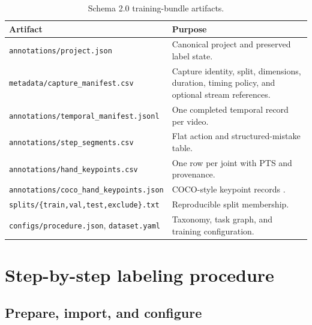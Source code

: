 \documentclass[10pt]{article}
\newcommand{\code}[1]{\texttt{\small #1}}
\begin{document}
\begin{table}[H]
\centering
\caption{Schema 2.0 training-bundle artifacts.}
\small
\begin{tabularx}{\textwidth}{@{}p{}Y@{}}
\toprule
\textbf{Artifact} & \textbf{Purpose}\\
\midrule
\code{annotations/project.json} & Canonical project and preserved label state.\\
\code{metadata/capture\_manifest.csv} & Capture identity, split, dimensions,
duration, timing policy, and optional stream references.\\
\code{annotations/temporal\_manifest.jsonl} & One completed temporal record per video.\\
\code{annotations/step\_segments.csv} & Flat action and structured-mistake table.\\
\code{annotations/hand\_keypoints.csv} & One row per joint with PTS and provenance.\\
\code{annotations/coco\_hand\_keypoints.json} & COCO-style keypoint records
\cite{lin2014coco}.\\
\code{splits/\{train,val,test,exclude\}.txt} & Reproducible split membership.\\
\code{configs/procedure.json}, \code{dataset.yaml} & Taxonomy, task graph, and
training configuration.\\
\bottomrule
\end{tabularx}
\end{table}

\section{Step-by-step labeling procedure}

\subsection{Prepare, import, and configure}
\end{document}
